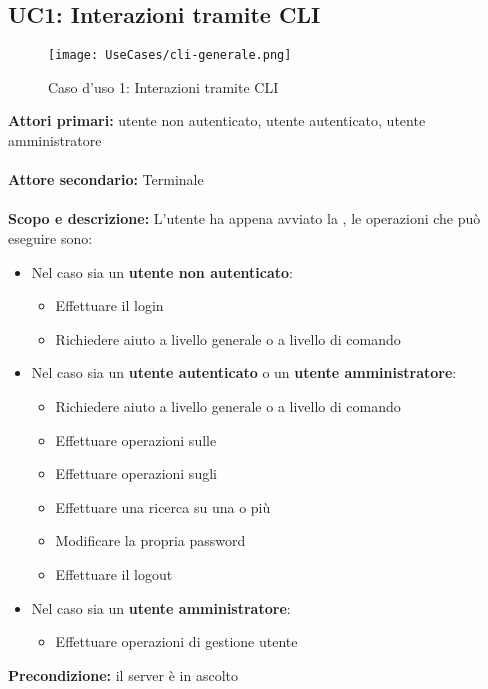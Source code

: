 \documentclass{scalatekids-article}
\begin{document}
\subsection{UC1: Interazioni tramite CLI}

\begin{figure}[H]
  \begin{center}
    \texttt{[image: UseCases/cli-generale.png]}
    \caption*{Caso d'uso 1: Interazioni tramite CLI}
  \end{center}
\end{figure}
\textbf{Attori primari:} utente non autenticato, utente autenticato, utente amministratore\\ \\
\textbf{Attore secondario:} Terminale\\ \\
\textbf{Scopo e descrizione:} L'utente ha appena avviato la , le operazioni che può eseguire sono:
\begin{itemize}
\item Nel caso sia un \textbf{utente non autenticato}:
  \begin{itemize}
  \item Effettuare il login
  \item Richiedere aiuto a livello generale o a livello di comando
  \end{itemize}
\item Nel caso sia un \textbf{utente autenticato} o un \textbf{utente amministratore}:
  \begin{itemize}
  \item Richiedere aiuto a livello generale o a livello di comando
  \item Effettuare operazioni sulle 
  \item Effettuare operazioni sugli 
  \item Effettuare una ricerca su una o più 
  \item Modificare la propria password
  \item Effettuare il logout
  \end{itemize}
\item Nel caso sia un \textbf{utente amministratore}:
  \begin{itemize}
  \item Effettuare operazioni di gestione utente
  \end{itemize}
\end{itemize}
\textbf{Precondizione:} il server è in ascolto\\ \\
\end{document}
